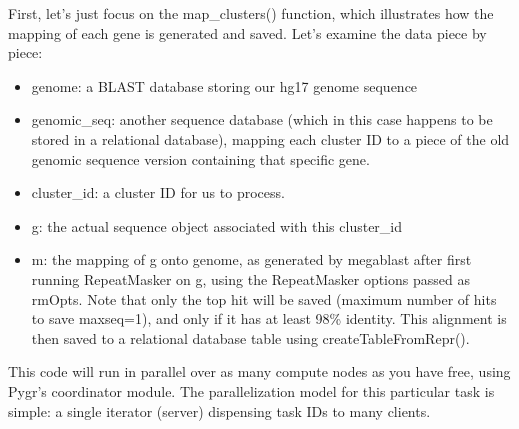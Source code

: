 \documentclass{howto}
\begin{document}
First, let's just focus on the map_clusters() function, which illustrates how the mapping of each gene is generated and saved.  Let's examine the data piece by piece:
\begin{itemize}

\item
genome: a BLAST database storing our hg17 genome sequence

\item
genomic_seq: another sequence database (which in this case happens to be stored in a relational database), mapping each cluster ID to a piece of the old genomic sequence version containing that specific gene.

\item   
cluster_id: a cluster ID for us to process.

\item
g: the actual sequence object associated with this cluster_id

\item
m: the mapping of g onto genome, as generated by megablast after first running RepeatMasker on g, using the RepeatMasker options passed as rmOpts.  Note that only the top hit will be saved (maximum number of hits to save maxseq=1), and only if it has at least 98\% identity.  This alignment is then saved to a relational database table using createTableFromRepr().

\end{itemize}
This code will run in parallel over as many compute nodes as you have free, using Pygr's coordinator module.  The parallelization model for this particular task is simple: a single iterator (server) dispensing task IDs to many clients. 
\end{document}
